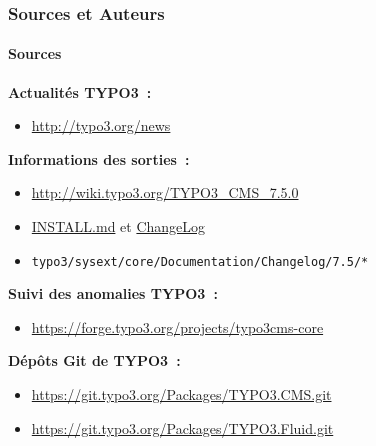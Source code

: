 \begin{frame}[fragile]
	\frametitle{Sources et Auteurs}
	\framesubtitle{Sources}

	\textbf{Actualités TYPO3~:}
		\begin{itemize}\smaller
			\item \url{http://typo3.org/news}
		\end{itemize}

	\textbf{Informations des sorties~:}
		\begin{itemize}\smaller
			\item \url{http://wiki.typo3.org/TYPO3_CMS_7.5.0}
			\item \href{https://github.com/TYPO3/TYPO3.CMS/blob/master/INSTALL.md}{INSTALL.md} et \href{https://github.com/TYPO3/TYPO3.CMS/blob/master/ChangeLog}{ChangeLog}
			\item \texttt{typo3/sysext/core/Documentation/Changelog/7.5/*}
		\end{itemize}

	\textbf{Suivi des anomalies TYPO3~:}
		\begin{itemize}\smaller
			\item \url{https://forge.typo3.org/projects/typo3cms-core}
		\end{itemize}

	\textbf{Dépôts Git de TYPO3~:}
		\begin{itemize}\smaller
			\item \url{https://git.typo3.org/Packages/TYPO3.CMS.git}
			\item \url{https://git.typo3.org/Packages/TYPO3.Fluid.git}
		\end{itemize}

\end{frame}


